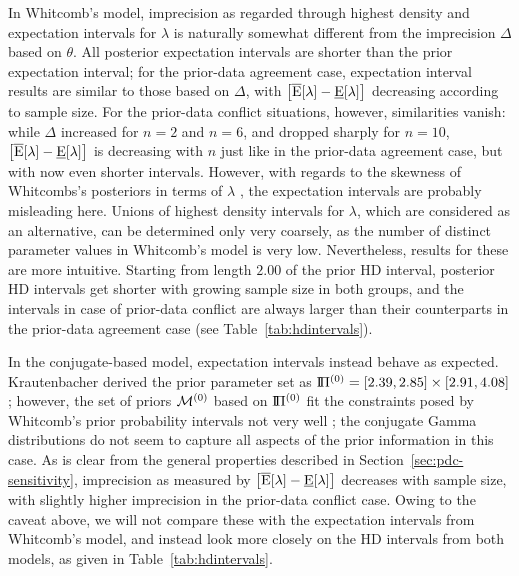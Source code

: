 In Whitcomb's model, imprecision as regarded through highest density and expectation intervals for $\lambda$ is
naturally somewhat different from the imprecision $\Delta$ based on $\theta$.
All posterior expectation intervals are shorter than the prior expectation interval;
for the prior-data agreement case, expectation interval results are similar to those based on $\Delta$,
with $\big[\overline{\operatorname{E}}[\lambda]-\underline{\operatorname{E}}[\lambda]\big]$ decreasing according to sample size.
For the prior-data conflict situations, however, similarities vanish:
while $\Delta$ increased for $n=2$ and $n=6$, and dropped sharply for $n=10$,
$\big[\overline{\operatorname{E}}[\lambda]-\underline{\operatorname{E}}[\lambda]\big]$ is decreasing with $n$ just like in the prior-data agreement case,
but with now even shorter intervals.
However, with regards to the skewness of Whitcombs's posteriors in terms of $\lambda$
\parencite[depicted in][Abb.~24, p.~62]{2011:krautenbacher},
the expectation intervals are probably misleading here.
Unions of highest density intervals for $\lambda$, which are considered as an alternative,
can be determined only very coarsely, as the number of distinct parameter values in Whitcomb's model is very low.
Nevertheless, results for these are more intuitive. %
Starting from length $2.00$ of the prior HD interval,
posterior HD intervals get shorter with growing sample size in both groups,
and the intervals in case of prior-data conflict are always larger
than their counterparts in the prior-data agreement case (see Table~\ref{tab:hdintervals}).

In the conjugate-based model, expectation intervals instead behave as expected.
Krautenbacher derived the prior parameter set as $\text{I}\!\Pi^{(0)} = [2.39, 2.85] \times [2.91, 4.08]$;
however, the set of priors $\mathcal{M}^{(0)}$ based on $\text{I}\!\Pi^{(0)}$ fit the constraints posed by Whitcomb's prior probability intervals
not very well \parencite[see][Abb.~20]{2011:krautenbacher};
the conjugate Gamma distributions do not seem to capture all aspects of the prior information in this case.
As is clear from the general properties described in Section~\ref{sec:pdc-sensitivity},
imprecision as measured by $\big[\overline{\operatorname{E}}[\lambda]-\underline{\operatorname{E}}[\lambda]\big]$ decreases with sample size,
with slightly higher imprecision in the prior-data conflict case. %
Owing to the caveat above, we will not compare these with the expectation intervals
from Whitcomb's model, and instead look more closely on the HD intervals from both models,
as given in Table~\ref{tab:hdintervals}.

